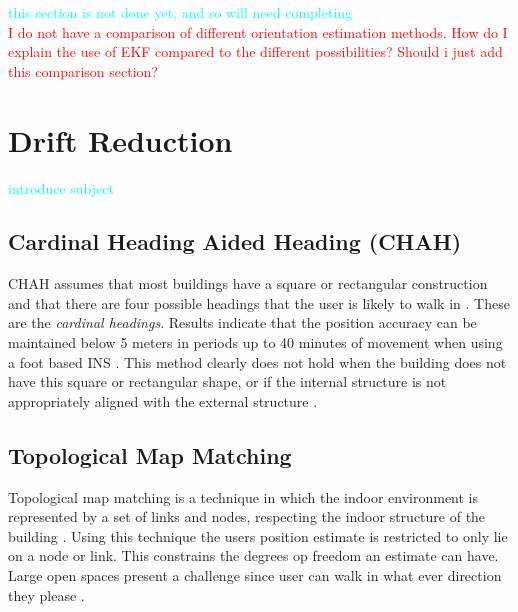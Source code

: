\textcolor{cyan}{this section is not done yet, and so will need completing } \\ \newline
\textcolor{red}{I do not have a comparison of different orientation estimation methods. How do I explain the use of EKF compared to the different possibilities? Should i just add this comparison section?}

\section{Drift Reduction}
\textcolor{cyan}{introduce subject}
\subsection*{Cardinal Heading Aided Heading (CHAH)}
CHAH assumes that most buildings have a square or rectangular construction and that there are four possible headings that the user is likely to walk in \cite{Abdulrahim2011}. These are the \textit{cardinal headings}. Results indicate that the position accuracy can be maintained below 5 meters in periods up to 40 minutes of movement when using a foot based \ac{INS}  \cite{Abdulrahim2011}. This method clearly does not hold when the building does not have this square or rectangular shape, or if the internal structure is not appropriately aligned with the external structure \cite{Davidson2017}.



\subsection*{Topological Map Matching}
Topological map matching is a technique in which the indoor environment is represented by a set of links and nodes, respecting the indoor structure of the building \cite{Davidson2017}. Using this technique the users position estimate is restricted to only lie on a node or link. This constrains the  degrees op freedom an estimate can have. Large open spaces present a challenge since user can walk in what ever direction they please \cite{Davidson2017}. 
%
